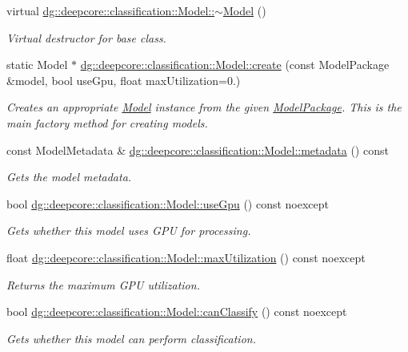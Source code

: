 \begin{DoxyCompactItemize}
virtual \hyperlink{group___classification_module_ga744d3e71e7c92fb7a8fa52e27095575f}{dg\+::deepcore\+::classification\+::\+Model\+::$\sim$\+Model} ()
\begin{DoxyCompactList}\small\item\em Virtual destructor for base class. \end{DoxyCompactList}\item 
static Model $\ast$ \hyperlink{group___classification_module_ga7b908a0f56b71ac72ae872e903a042e2}{dg\+::deepcore\+::classification\+::\+Model\+::create} (const Model\+Package \&model, bool use\+Gpu, float max\+Utilization=0.)
\begin{DoxyCompactList}\small\item\em Creates an appropriate \hyperlink{classdg_1_1deepcore_1_1classification_1_1_model}{Model} instance from the given \hyperlink{classdg_1_1deepcore_1_1classification_1_1_model_package}{Model\+Package}. This is the main factory method for creating models. \end{DoxyCompactList}\item 
const Model\+Metadata \& \hyperlink{group___classification_module_ga33bdb8fac324a49d0e70175a1440cdd1}{dg\+::deepcore\+::classification\+::\+Model\+::metadata} () const 
\begin{DoxyCompactList}\small\item\em Gets the model metadata. \end{DoxyCompactList}\item 
bool \hyperlink{group___classification_module_gaea38e3353458ab22d099d54411d6f868}{dg\+::deepcore\+::classification\+::\+Model\+::use\+Gpu} () const noexcept
\begin{DoxyCompactList}\small\item\em Gets whether this model uses G\+PU for processing. \end{DoxyCompactList}\item 
float \hyperlink{group___classification_module_ga08d73772f04eb0553e4d787c69b34aa2}{dg\+::deepcore\+::classification\+::\+Model\+::max\+Utilization} () const noexcept
\begin{DoxyCompactList}\small\item\em Returns the maximum G\+PU utilization. \end{DoxyCompactList}\item 
bool \hyperlink{group___classification_module_ga27cea1c556b1303cd34db8df4f4a33da}{dg\+::deepcore\+::classification\+::\+Model\+::can\+Classify} () const noexcept
\begin{DoxyCompactList}\small\item\em Gets whether this model can perform classification. \end{DoxyCompactList}\item 

\end{DoxyCompactItemize}
